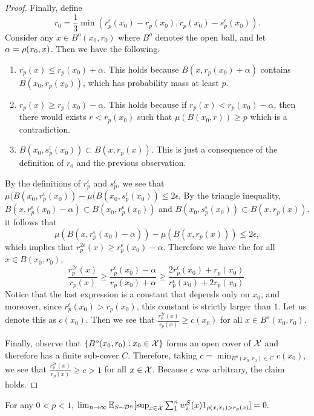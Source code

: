 \begin{proof}
Finally, define $$r_0 = \frac{1}{3}\min(r_p^{\epsilon}(x_0) - r_p(x_0), r_p(x_0) - s_p^{\epsilon}(x_0)).$$ Consider any $x \in B^o(x_0, r_0)$ where $B^o$ denotes the open ball, and let $\alpha = \rho(x_0, x)$. Then we have the following. 
\begin{enumerate}
	\item $r_p(x) \leq r_p(x_0) + \alpha$. This holds because $B(x, r_p(x_0) + \alpha)$ contains $B(x_0, r_p(x_0))$, which has probability mass at least $p$. 
	\item $r_p(x) \geq r_p(x_0) - \alpha$. This holds because if $r_p(x) < r_p(x_0) - \alpha$, then there would exists $r < r_p(x_0)$ such that $\mu(B(x_0, r)) \geq p$ which is a contradiction.
	\item $B(x_0, s_p^{\epsilon}(x_0)) \subset B(x, r_p(x)).$ This is just a consequence of the definition of $r_0$ and the previous observation.
\end{enumerate}
By the definitions of $r_p^\epsilon$ and $s_p^\epsilon$, we see that $\mu(B(x_0, r_p^{\epsilon}(x_0)) - \mu(B(x_0, s_p^\epsilon(x_0)) \leq 2\epsilon$. By the triangle inequality, $B(x, r_p^{\epsilon}(x_0) - \alpha) \subset B(x_0, r_p^\epsilon(x_0))$ and $B(x_0, s_p^{\epsilon}(x_0)) \subset B(x, r_p(x))$. it follows that $$\mu(B(x, r_p^{\epsilon}(x_0) - \alpha)) - \mu(B(x, r_p(x))) \leq 2\epsilon,$$ which implies that $r_p^{2\epsilon}(x) \geq r_p^{\epsilon}(x_0) - \alpha$. Therefore we have the for all $x \in B(x_0, r_0)$, $$\frac{r_p^{2\epsilon}(x) }{r_p(x)} \geq \frac{r_p^{\epsilon}(x_0) - \alpha}{r_p(x_0) + \alpha} \geq \frac{2r_p^\epsilon(x_0) + r_p(x_0)}{r_p^\epsilon(x_0) + 2r_p(x_0)}.$$ Notice that the last expression is a constant that depends only on $x_0$, and moreover, since $r_p^\epsilon(x_0) > r_p(x_0)$, this constant is strictly larger than $1$. Let us denote this as $c(x_0)$. Then we see that $\frac{r_p^{2\epsilon}(x)}{r_p(x)} \geq c(x_0)$ for all $x \in B^o(x_0, r_0)$. 

Finally, observe that $\{B^o(x_0, r_0): x_0 \in \mathcal X\}$ forms an open cover of $\mathcal X$ and therefore has a finite sub-cover $C$. Therefore, taking $c = \min_{B^o(x_0, r_0) \in C}c(x_0)$, we see that $\frac{r_p^{2\epsilon}(x)}{r_p(x)} \geq c > 1$ for all $x \in \mathcal X$. Because $\epsilon$ was arbitrary, the claim holds.
\end{proof}


\begin{lem}\label{cl:kern_radius}
For any $0 < p < 1$, $\lim_{n \to \infty} \mathbb{E}_{S \sim {\mathcal D}^n}[ \sup_{x \in \mathcal X} \sum_1^n w_i^S(x)1_{\rho(x, x_i) > r_p(x)}] = 0.$ 
\end{lem}


